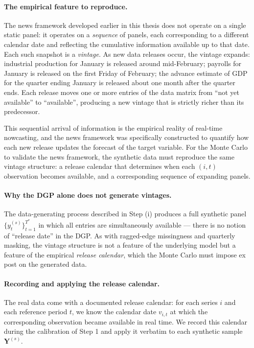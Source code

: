\documentclass[11pt, a4paper, oneside]{article}
\newcommand{\mY}{\mathbf{Y}}
\begin{document}
\paragraph{The empirical feature to reproduce.}
The news framework developed earlier in this thesis does not
operate on a single static panel: it operates on a \emph{sequence}
of panels, each corresponding to a different calendar date and
reflecting the cumulative information available up to that date.
Each such snapshot is a \emph{vintage}. As new data releases occur,
the vintage expands: industrial production for January is released
around mid-February; payrolls for January is released on the first
Friday of February; the advance estimate of GDP for the quarter
ending January is released about one month after the quarter ends.
Each release moves one or more entries of the data matrix from
``not yet available'' to ``available'', producing a new vintage
that is strictly richer than its predecessor.

This sequential arrival of information is the empirical reality of
real-time nowcasting, and the news framework was specifically
constructed to quantify how each new release updates the forecast
of the target variable. For the Monte Carlo to validate the news
framework, the synthetic data must reproduce the same vintage
structure: a release calendar that determines when each $(i, t)$
observation becomes available, and a corresponding sequence of
expanding panels.

\paragraph{Why the DGP alone does not generate vintages.}
The data-generating process described in Step (i) produces a full
synthetic panel $\{y_t^{(s)}\}_{t=1}^{T^*}$ in which all entries
are simultaneously available — there is no notion of ``release
date'' in the DGP. As with ragged-edge missingness and quarterly
masking, the vintage structure is not a feature of the underlying
model but a feature of the empirical \emph{release calendar},
which the Monte Carlo must impose ex post on the generated data.

\paragraph{Recording and applying the release calendar.}
The real data come with a documented release calendar: for each
series $i$ and each reference period $t$, we know the calendar
date $v_{i, t}$ at which the corresponding observation became
available in real time. We record this calendar during the
calibration of Step 1 and apply it verbatim to each synthetic
sample $\mY^{(s)}$.
\end{document}

